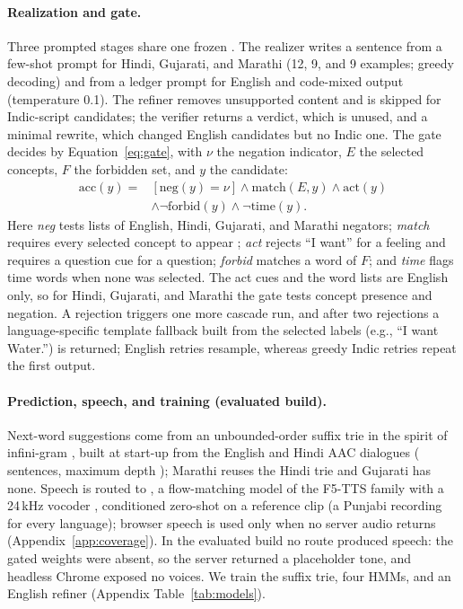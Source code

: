 \paragraph{Realization and gate.}
Three prompted stages share one frozen \qwen{}.
The realizer writes a sentence from a few-shot prompt for Hindi, Gujarati, and Marathi (12, 9, and 9 examples; greedy decoding) and from a ledger prompt for English and code-mixed output (temperature 0.1).
The refiner removes unsupported content and is skipped for Indic-script candidates; the verifier returns a verdict, which is unused, and a minimal rewrite, which changed English candidates but no Indic one.
The gate decides by Equation~\eqref{eq:gate}, with $\nu$ the negation indicator, $E$ the selected concepts, $F$ the forbidden set, and $y$ the candidate:
\begin{equation}
\begin{split}
\mathrm{acc}(y)={}&[\mathrm{neg}(y)=\nu]\wedge\mathrm{match}(E,y)\wedge\mathrm{act}(y)\\
&\wedge\neg\mathrm{forbid}(y)\wedge\neg\mathrm{time}(y).
\end{split}
\label{eq:gate}
\end{equation}
Here \emph{neg} tests lists of English, Hindi, Gujarati, and Marathi negators; \emph{match} requires every selected concept to appear ; \emph{act} rejects ``I want'' for a feeling and requires a question cue for a question; \emph{forbid} matches a word of $F$; and \emph{time} flags time words when none was selected.
The act cues and the word lists are English only, so for Hindi, Gujarati, and Marathi the gate tests concept presence and negation.
A rejection triggers one more cascade run, and after two rejections a language-specific template fallback built from the selected labels (e.g., ``I want Water.'') is returned; English retries resample, whereas greedy Indic retries repeat the first output.

\paragraph{Prediction, speech, and training (evaluated build).}
Next-word suggestions come from an unbounded-order suffix trie in the spirit of infini-gram \citep{liu2024infinigram}, built at start-up from the English and Hindi AAC dialogues (\IGSent{} sentences, maximum depth \IGDepth{}); Marathi reuses the Hindi trie and Gujarati has none.
Speech is routed to \indicf{} \citep{ai4bharat2025indicf5}, a flow-matching model of the F5-TTS family \citep{chen2025f5tts} with a 24\,kHz \vocos{} vocoder \citep{siuzdak2023vocos}, conditioned zero-shot on a reference clip (a Punjabi recording for every language); browser speech is used only when no server audio returns (Appendix~\ref{app:coverage}).
In the evaluated build no route produced speech: the gated weights were absent, so the server returned a placeholder tone, and headless Chrome exposed no voices.
We train the suffix trie, four HMMs, and an English \flant{} refiner (Appendix Table~\ref{tab:models}).

